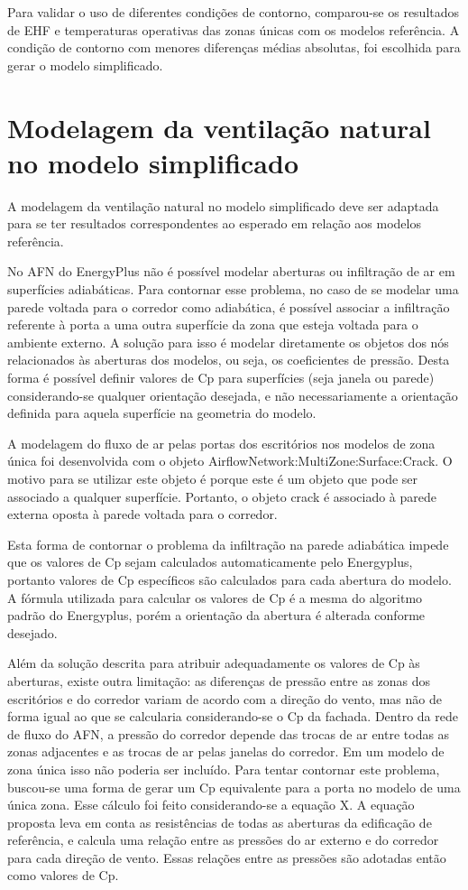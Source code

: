 \documentclass[brazil,hardcopy,openany,a5paper]{ufscthesis}
\begin{document}
		Para validar o uso de diferentes condições de contorno, comparou-se os resultados de EHF e temperaturas operativas das zonas únicas com os modelos referência. A condição de contorno com menores diferenças médias absolutas, foi escolhida para gerar o modelo simplificado.
		
		\section{Modelagem da ventilação natural no modelo simplificado}
		
		A modelagem da ventilação natural no modelo simplificado deve ser adaptada para se ter resultados correspondentes ao esperado em relação aos modelos referência.
		
		No AFN do EnergyPlus não é possível modelar aberturas ou infiltração de ar em superfícies adiabáticas. Para contornar esse problema, no caso de se modelar uma parede voltada para o corredor como adiabática, é possível associar a infiltração referente à porta a uma outra superfície da zona que esteja voltada para o ambiente externo. A solução para isso é modelar diretamente os objetos dos nós relacionados às aberturas dos modelos, ou seja, os coeficientes de pressão. Desta forma é possível definir valores de Cp para superfícies (seja janela ou parede) considerando-se qualquer orientação desejada, e não necessariamente a orientação definida para aquela superfície na geometria do modelo.
		
		A modelagem do fluxo de ar pelas portas dos escritórios nos modelos de zona única foi desenvolvida com o objeto AirflowNetwork:MultiZone:Surface:Crack. O motivo para se utilizar este objeto é porque este é um objeto que pode ser associado a qualquer superfície. Portanto, o objeto crack é associado à parede externa oposta à parede voltada para o corredor.
		
		Esta forma de contornar o problema da infiltração na parede adiabática impede que os valores de Cp sejam calculados automaticamente pelo Energyplus, portanto valores de Cp específicos são calculados para cada abertura do modelo. A fórmula utilizada para calcular os valores de Cp é a mesma do algoritmo padrão do Energyplus, porém a orientação da abertura é alterada conforme desejado.
		
		Além da solução descrita para atribuir adequadamente os valores de Cp às aberturas, existe outra limitação: as diferenças de pressão entre as zonas dos escritórios e do corredor variam de acordo com a direção do vento, mas não de forma igual ao que se calcularia considerando-se o Cp da fachada. Dentro da rede de fluxo do AFN, a pressão do corredor depende das trocas de ar entre todas as zonas adjacentes e as trocas de ar pelas janelas do corredor. Em um modelo de zona única isso não poderia ser incluído. Para tentar contornar este problema, buscou-se uma forma de gerar um Cp equivalente para a porta no modelo de uma única zona. Esse cálculo foi feito considerando-se a equação X. A equação proposta leva em conta as resistências de todas as aberturas da edificação de referência, e calcula uma relação entre as pressões do ar externo e do corredor para cada direção de vento. Essas relações entre as pressões são adotadas então como valores de Cp.
		
\end{document}
